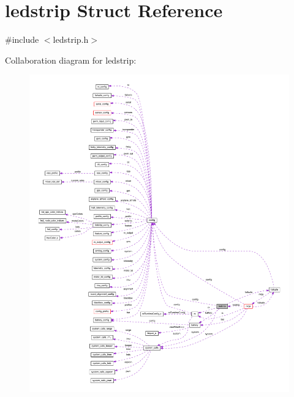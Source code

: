 \hypertarget{structledstrip}{\section{ledstrip Struct Reference}
\label{structledstrip}
}


{\ttfamily \#include $<$ledstrip.\+h$>$}



Collaboration diagram for ledstrip\+:\nopagebreak
\begin{figure}[H]
\begin{center}
\leavevmode
\includegraphics[width=350pt]{structledstrip__coll__graph}
\end{center}
\end{figure}
